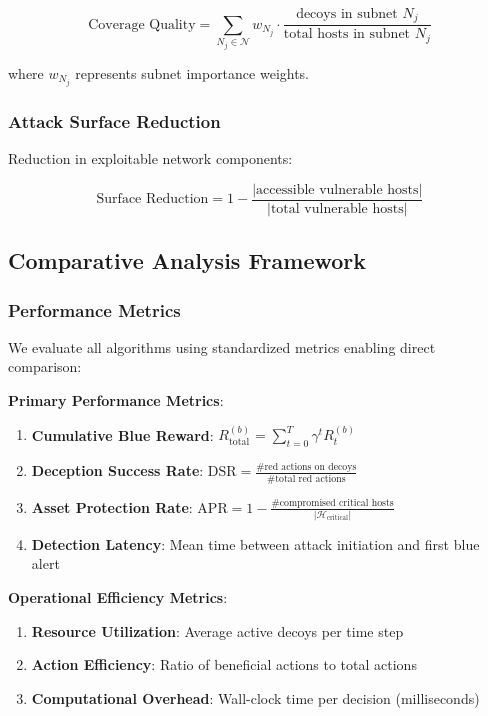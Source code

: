 \documentclass[12pt,oneside]{article}
\begin{document}
\begin{equation}
\text{Coverage Quality} = \sum_{N_j \in \mathcal{N}} w_{N_j} \cdot \frac{\text{decoys in subnet } N_j}{\text{total hosts in subnet } N_j}
\end{equation}

where $w_{N_j}$ represents subnet importance weights.

\subsubsection{Attack Surface Reduction}
Reduction in exploitable network components:

\begin{equation}
\text{Surface Reduction} = 1 - \frac{|\text{accessible vulnerable hosts}|}{|\text{total vulnerable hosts}|}
\end{equation}



\subsection{Comparative Analysis Framework}

\subsubsection{Performance Metrics}

We evaluate all algorithms using standardized metrics enabling direct comparison:

\textbf{Primary Performance Metrics}:
\begin{enumerate}
    \item \textbf{Cumulative Blue Reward}: $R_{\text{total}}^{(b)} = \sum_{t=0}^{T} \gamma^t R_t^{(b)}$
    \item \textbf{Deception Success Rate}: $\text{DSR} = \frac{\text{\# red actions on decoys}}{\text{\# total red actions}}$
    \item \textbf{Asset Protection Rate}: $\text{APR} = 1 - \frac{\text{\# compromised critical hosts}}{|\mathcal{H}_{\text{critical}}|}$
    \item \textbf{Detection Latency}: Mean time between attack initiation and first blue alert
\end{enumerate}

\textbf{Operational Efficiency Metrics}:
\begin{enumerate}
    \item \textbf{Resource Utilization}: Average active decoys per time step
    \item \textbf{Action Efficiency}: Ratio of beneficial actions to total actions
    \item \textbf{Computational Overhead}: Wall-clock time per decision (milliseconds)
\end{enumerate}
\end{document}
